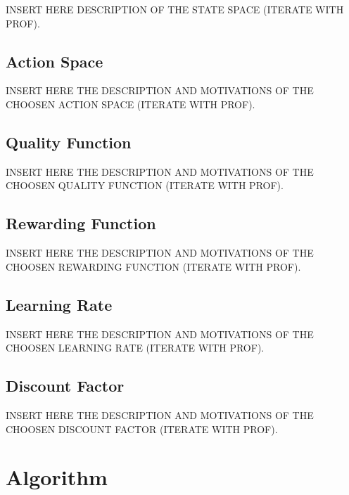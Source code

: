 INSERT HERE DESCRIPTION OF THE STATE SPACE (ITERATE WITH PROF).


\subsection{Action Space}
\label{sec:smart-elasticity-elasticity-leveraging-q-learning-action-space}

INSERT HERE THE DESCRIPTION AND MOTIVATIONS OF THE CHOOSEN ACTION SPACE (ITERATE WITH PROF).


\subsection{Quality Function}
\label{sec:smart-elasticity-elasticity-leveraging-q-learning-quality-function}

INSERT HERE THE DESCRIPTION AND MOTIVATIONS OF THE CHOOSEN QUALITY FUNCTION (ITERATE WITH PROF).


\subsection{Rewarding Function}
\label{sec:smart-elasticity-elasticity-leveraging-q-learning-rewarding-function}

INSERT HERE THE DESCRIPTION AND MOTIVATIONS OF THE CHOOSEN REWARDING FUNCTION (ITERATE WITH PROF).


\subsection{Learning Rate}
\label{sec:smart-elasticity-elasticity-leveraging-q-learning-learning-rate}

INSERT HERE THE DESCRIPTION AND MOTIVATIONS OF THE CHOOSEN LEARNING RATE (ITERATE WITH PROF).


\subsection{Discount Factor}
\label{sec:smart-elasticity-elasticity-leveraging-q-learning-discount-factor}

INSERT HERE THE DESCRIPTION AND MOTIVATIONS OF THE CHOOSEN DISCOUNT FACTOR (ITERATE WITH PROF).


\section{Algorithm}
\label{sec:smart-elasticity-algorithm}

